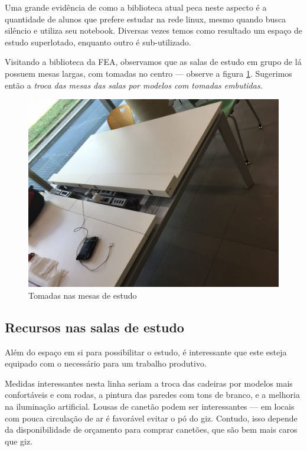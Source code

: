 \documentclass[titlepage]{article}
\begin{document}
Uma grande evidência de como a biblioteca atual peca neste aspecto é a 
quantidade de alunos que prefere estudar na rede linux, mesmo quando busca 
silêncio e utiliza seu notebook. Diversas vezes temos como resultado um espaço 
de estudo superlotado, enquanto outro é sub-utilizado.

Visitando a biblioteca da FEA, observamos que as salas de estudo em grupo de 
lá possuem mesas largas, com tomadas no centro --- observe a figura 
\ref{fig:tomada}. Sugerimos então a \emph{troca das mesas das salas por modelos
com tomadas embutidas}. 

\begin{figure}[ht!]
\caption{Tomadas nas mesas de estudo}
\label{fig:tomada}
\centering
\includegraphics[width=1\textwidth]{tomada}
\end{figure}

\subsection{Recursos nas salas de estudo}
Além do espaço em si para possibilitar o estudo, é interessante que este esteja
equipado com o necessário para um trabalho produtivo.

Medidas interessantes nesta linha seriam a troca das cadeiras por modelos mais 
confortáveis e com rodas, a pintura das paredes com tons de branco, e a melhoria
na iluminação artificial. Lousas de canetão podem ser interessantes --- em 
locais com pouca circulação de ar é favorável evitar o pó do giz. Contudo, 
isso depende da disponibilidade de orçamento para comprar canetões, que são bem
mais caros que giz.
\end{document}
